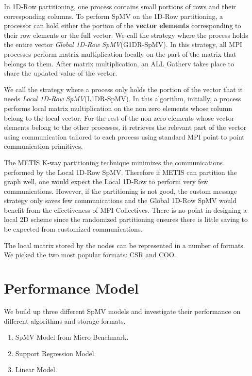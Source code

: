 \documentclass[conference, 10ppt]{IEEEtran}
\begin{document}
In 1D-Row partitioning, one process contains small portions of rows
and their corresponding columns. To perform SpMV on the 1D-Row
partitioning, a processor can hold either the portion of the \textbf{vector
  elements} corresponding to their row elements or the full vector.
We call the strategy where the process holds the entire vector \textit{Global
  1D-Row SpMV}(G1DR-SpMV). In this strategy, all MPI processes
perform matrix multiplication locally on the part of the matrix that
belongs to them. After matrix multiplication, an ALL$\_$Gatherv takes
place to share the updated value of the vector.

We call the strategy where a process only holds the portion of the
vector that it needs \textit{Local 1D-Row SpMV}(L1DR-SpMV).  In this
algorithm, initially, a process performs local matrix multiplication
on the non zero elements whose column belong to the local vector.  For
the rest of the non zero elements whose vector elements belong to the
other processes, it retrieves the relevant part of the vector using
communication tailored to each process using standard MPI point to
point communication primitives.

The METIS K-way partitioning technique minimizes the communications
performed by the Local 1D-Row SpMV. Therefore if METIS can partition
the graph well, one would expect the Local 1D-Row to perform very few
communications. However, if the partitioning is not good, the custom
message strategy only saves few communications and the Global 1D-Row
SpMV would benefit from the effectiveness of MPI Collectives. There is
no point in designing a local 2D scheme since the randomized
partitioning ensures there is little saving to be expected from
customized communications.

The local matrix stored by the nodes can be represented in a number of
formats. We picked the two most popular formats: CSR and COO.

\section{Performance Model}
We build up three different SpMV models and investigate their performance on different algorithms and
storage formats.
\begin{enumerate}
\item SpMV Model from Micro-Benchmark.
\item Support Regression Model.
\item Linear Model.
\end{enumerate} 
\end{document}
